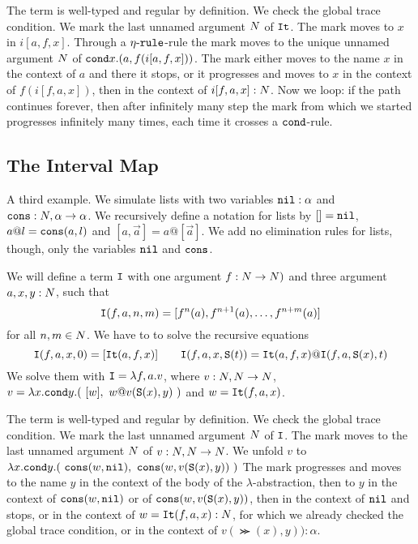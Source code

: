 \documentclass{article}
\begin{document}
The term is well-typed and regular by definition. We check the global trace condition. 
We mark the last unnamed argument ${N}$ of ${\tt It}$. The mark moves to $x$ in $ i[a,f,x]$.
 Through a ${\eta\mbox{-}\tt rule}$-rule the mark moves to the unique unnamed argument ${N}$ of  
$ {\tt cond} x. (a, f( i[a,f,x]) )$.
The mark either moves to the name $x$ in the context of $a$ and there it stops, or 
it progresses and moves to $x$ in the context of $f(i[f,a,x])$, then in the context of $i[f,a,x]:{N}$.
Now we loop: if the path continues forever, then after infinitely many step the mark from which we started 
progresses infinitely many times, each time it crosses a ${\tt cond}$-rule.



\subsection{The Interval Map}
A third example. We simulate lists with two variables ${\tt nil}:\alpha$ and 
${\tt cons}:{N},\alpha \rightarrow \alpha$. We recursively define a notation for lists by $[]={\tt nil}$,
$a @ l={\tt cons}(a,l)$ and $[a,\vec{a}] = a @ [\vec{a}]$. We add no elimination rules for lists, though,
only the variables ${\tt nil}$ and ${\tt cons}$.

We will define a term ${\tt I}$ with one argument $f:{N} \rightarrow {N})$ and three argument
$a,x,y:{N}$, such that 
$$
{\tt I}(f,a,n,m) = [f^n(a), f^{n+1}(a), \ldots, f^{n+m}(a)]
$$ 
for all $n,m \in {N}$. 
We have to to solve the recursive equations 
$$
\Interval(f,a,x,0) = [\Iter(a,f,x)]
\ \ \ \ \ \ 
\Interval(f,a,x,\Succ (t)) = \Iter(a,f,x) @ \Interval(f,a,\Succ(x),t)
$$ 
We solve them with ${\tt I} = \lambda f,a.v$,
where $v:{N},{N}\rightarrow {N}$, 
$v = \lambda x.{\tt cond} y. (\ [w],  \  w @ v({\tt S} (x),y) \ )$ and $w={\tt It}(f,a,x)$.

The term is well-typed and regular by definition. We check the global trace condition.
We mark the last unnamed argument ${N}$ of ${\tt I}$.
The mark moves to the last unnamed argument ${N}$ of  
$v:{N},{N} \rightarrow {N}$. 
We unfold $v$ to $\lambda x.{\tt cond} y. 
(\ {\tt cons}(w, {\tt nil}),  \  {\tt cons}(w, v({\tt S} (x),y)) \ )$
The mark progresses and moves to the name $y$ in the context of the body of the $\lambda$-abstraction,
then to $y$ in the context of ${\tt cons}(w, {\tt nil})$ or of ${\tt cons}(w, v({\tt S} (x),y))$,
then in the context of ${\tt nil}$ and stops, or in the context of $w={\tt It}(f,a,x):{N}$, 
for which we already checked the global trace condition, or in the context of $v(\Succ (x),y)):\alpha$. 
\end{document}
